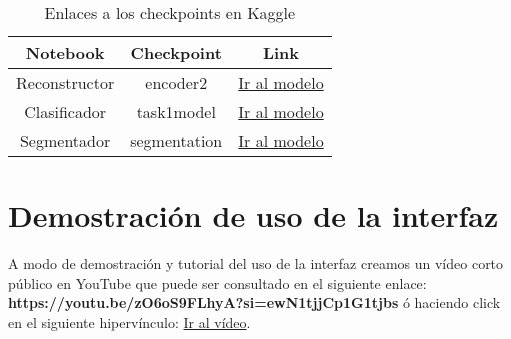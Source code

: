 \begin{table}[H]
	\centering
	\begin{tabular}{|ccc|}
		\toprule
		Notebook & Checkpoint & Link \\
		\midrule
		Reconstructor & encoder2 & \href{https://www.kaggle.com/datasets/jaimecastillo/encoder2}{Ir al modelo} \\
		Clasificador & task1model &  \href{https://www.kaggle.com/datasets/jaimecastillo/task1model}{Ir al modelo}\\
		Segmentador & segmentation & \href{https://www.kaggle.com/datasets/jaimecastillo/segmentation}{Ir al modelo}\\  
		\bottomrule
	\end{tabular}
	\caption{Enlaces a los checkpoints en Kaggle}
	\label{tabla:checkpointsKaggle}
\end{table}

\section{Demostración de uso de la interfaz}

A modo de demostración y tutorial del uso de la interfaz creamos un vídeo corto público en YouTube que puede ser consultado en el siguiente enlace: \textbf{https://youtu.be/zO6oS9FLhyA?si=ewN1tjjCp1G1tjbs}  ó haciendo click en el siguiente hipervínculo: \href{https://youtu.be/zO6oS9FLhyA?si=ewN1tjjCp1G1tjbs}{Ir al vídeo}.